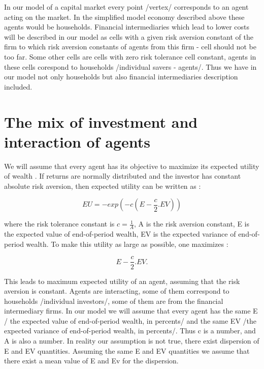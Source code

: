 \documentclass[10pt]{article}
\begin{document}
In our model of a capital market every point /vertex/ corresponds to an agent acting on the market. In the simplified model economy described above these agents would be households. Financial intermediaries which lead to lower costs will be described in our model as cells with a given risk aversion constant of the firm to which risk aversion constants of agents from this firm - cell should not be too far. Some other cells are cells with zero risk tolerance cell constant, agents in these cells corespond to households /individual savers - agents/. Thus we have in our model not only households but also financial intermediaries description included.


\section{The mix of investment and interaction of agents}

We will assume that every agent has its objective to maximize its expected
utility of wealth \cite{8}. If returns are normally distributed and the investor has constant absolute risk aversion, then expected utility can be written as \cite{9}:

\begin{equation}
\label{2'}
EU = - exp{(-c(E-\frac{c}{2}.EV))}
\end{equation}

where the risk tolerance constant is $c = \frac{1}{A}$, A is the risk aversion constant, E is the expected value of end-of-period wealth, EV is the expected variance of end-of-period wealth. To make this utility as large as possible, one maximizes \cite{10}:

\begin{equation}
\label{2''}
E - \frac{c}{2} . EV.
\end{equation}

This leads to maximum expected utility of an agent, assuming that the risk aversion is constant.
Agents are interacting, some of them correspond to households /individual investors/, some of them are from the financial intermediary firms. In our model we will assume that every agent has the same E / the expected value of end-of-period wealth, in percents/ and the same EV /the expected variance of end-of-period wealth, in percents/. Thus c is a number, and A is also a number. In reality our assumption is not true, there exist dispersion of E and EV quantities. Assuming the same E and EV quantities we assume that there exist a mean value of E and Ev for the dispersion.
\end{document}
